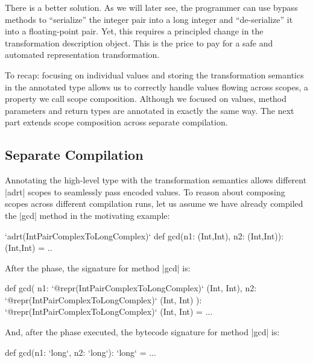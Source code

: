 There is a better solution. As we will later see, the programmer can use bypass methods to ``serialize'' the integer pair into a long integer and ``de-serialize'' it into a floating-point pair. Yet, this requires a principled change in the transformation description object. This is the price to pay for a safe and automated representation transformation.

To recap: focusing on individual values and storing the transformation semantics in the annotated type allows us to correctly handle values flowing across scopes, a property we call scope composition. Although we focused on values, method parameters and return types
are annotated in exactly the same way. The next part extends scope composition across separate compilation.


\subsection{Separate Compilation}
\label{sec:ildl:separate-compilation}

Annotating the high-level type with the transformation semantics allows different |adrt| scopes to seamlessly pass encoded values. To reason about composing scopes across different compilation runs, let us assume we have already compiled the |gcd| method in the motivating example:

\begin{lstlisting-nobreak}
`adrt(IntPairComplexToLongComplex)` {
  def gcd(n1: (Int,Int), n2: (Int,Int)): (Int,Int) = ..
}
\end{lstlisting-nobreak}

After the \inject{} phase, the signature for method |gcd| is:

\begin{lstlisting-nobreak}
def gcd(
    n1: `@repr(IntPairComplexToLongComplex)` (Int, Int),
    n2: `@repr(IntPairComplexToLongComplex)` (Int, Int)
  ): `@repr(IntPairComplexToLongComplex)` (Int, Int) = ...
\end{lstlisting-nobreak}

And, after the \commit{} phase executed, the bytecode signature for method |gcd| is:

\begin{lstlisting-nobreak}
def gcd(n1: `long`, n2: `long`): `long` = ...
\end{lstlisting-nobreak}

